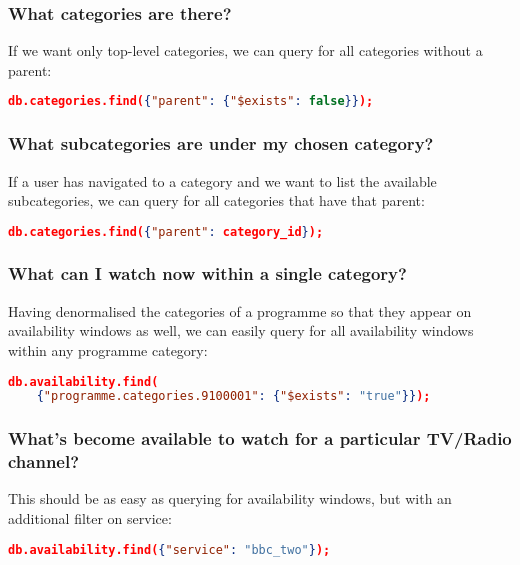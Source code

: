 \documentclass[11pt,a4paper]{article}
\begin{document}
\subsubsection{What categories are there?}

If we want only top-level categories, we can query for all categories
without a parent:

\begin{lstlisting}[language=json]
  db.categories.find({"parent": {"$exists": false}});
\end{lstlisting}

\subsubsection{What subcategories are under my chosen category?}

If a user has navigated to a category and we want to list the available
subcategories, we can query for all categories that have that parent:

\begin{lstlisting}[language=json]
  db.categories.find({"parent": category_id});
\end{lstlisting}

\subsubsection{What can I watch now within a single category?}

Having denormalised the categories of a programme so that they appear
on availability windows as well, we can easily query for all
availability windows within any programme category:

\begin{lstlisting}[language=json]
  db.availability.find(
    {"programme.categories.9100001": {"$exists": "true"}});
\end{lstlisting}

\subsubsection{What's become available to watch for a particular TV/Radio channel?}

This should be as easy as querying for availability windows, but with an
additional filter on service:

\begin{lstlisting}[language=json]
  db.availability.find({"service": "bbc_two"});
\end{lstlisting}
\end{document}
